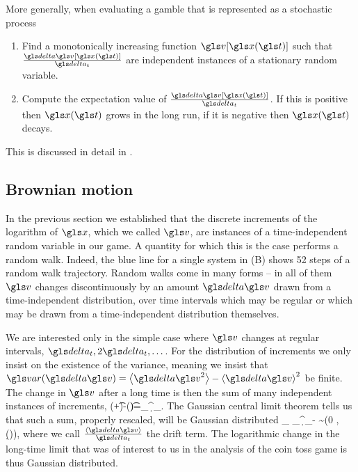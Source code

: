 More generally, when evaluating a gamble that is represented as a stochastic process 
\begin{enumerate}
\item
Find a monotonically increasing function $\gv[\x(\t)]$ such that $\frac{\d \gv[\x(\t)]}{\dt}$ 
are independent instances of a stationary random variable.
\item
Compute the expectation value of $\frac{\d \gv[\x(\t)]}{\dt}$. If this is positive then $\x(\t)$
grows in the long run, if it is negative then $\x(\t)$ decays.
\end{enumerate}

This is discussed in detail in .

\subsection{Brownian motion}
In the previous section we established that the discrete increments of the logarithm of 
$\x$, which we called $\gv$, are instances of a time-independent random variable in our game. A quantity 
for which this is the case performs a random walk.
Indeed, the blue line for a single system in  (B) shows 52 steps of a random walk trajectory.
Random walks come in many forms -- in all of them $\gv$ changes discontinuously by an amount 
$\d \gv$ drawn from a time-independent distribution, over time intervals which may be regular or which may be drawn from a time-independent distribution themselves.

We are interested only in the simple case where $\gv$ changes at regular intervals, $\dt, 2\dt, \dots$. For 
the distribution of increments we only insist on the existence of the variance, meaning we insist that 
$\var(\d \gv)=\ave{\d \gv^2}-\ave{\d \gv}^2$ be finite. The change in $\gv$ after a long time is then the sum 
of many independent instances of increments, 
\be
\gv(\t+\T\dt)-\gv(\t)=\sum_\gi^\T \d \gv_\gi.
\ee
The Gaussian central limit theorem tells us that such a sum, properly rescaled, will be 
Gaussian distributed
\be
\lim_{\T\to\infty} \sum_\gi^\T \d \gv_\gi -\T\ave{\d \gv} \sim \mathcal{\N}(0 , \var(\d \gv)),
\ee
where we call $\frac{\ave{\d \gv}}{\dt}$ the drift term. The logarithmic change in the 
long-time limit that was of interest to us in the analysis of the coin toss game is thus 
Gaussian distributed. 

